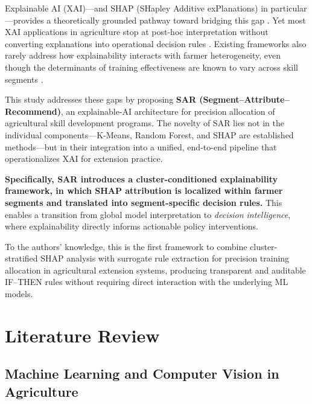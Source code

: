 \documentclass[3p,twocolumn,authoryear]{elsarticle}
\begin{document}
Explainable AI (XAI)---and SHAP (SHapley Additive exPlanations) in
particular---provides a theoretically grounded pathway toward bridging
this gap \citep{lundberg2017,guidotti2019}.
Yet most XAI applications in agriculture stop at post-hoc interpretation
without converting explanations into operational decision rules
\citep{ryo2022,linardatos2021}.
Existing frameworks also rarely address how explainability interacts with
farmer heterogeneity, even though the determinants of training
effectiveness are known to vary across skill segments
\citep{davis2012,arrieta2020}.

This study addresses these gaps by proposing \textbf{SAR
(Segment--Attribute--Recommend)}, an explainable-AI architecture for
precision allocation of agricultural skill development programs.
The novelty of SAR lies not in the individual components---K-Means,
Random Forest, and SHAP are established methods---but in their integration
into a unified, end-to-end pipeline that operationalizes XAI for extension
practice.

\textbf{Specifically, SAR introduces a cluster-conditioned explainability
framework, in which SHAP attribution is localized within farmer segments
and translated into segment-specific decision rules.}
This enables a transition from global model interpretation to
\textit{decision intelligence}, where explainability directly informs
actionable policy interventions.

To the authors' knowledge, this is the first framework to combine
cluster-stratified SHAP analysis with surrogate rule extraction for
precision training allocation in agricultural extension systems,
producing transparent and auditable IF--THEN rules without requiring
direct interaction with the underlying ML models.

\section{Literature Review}

\subsection{Machine Learning and Computer Vision in Agriculture}
\end{document}
